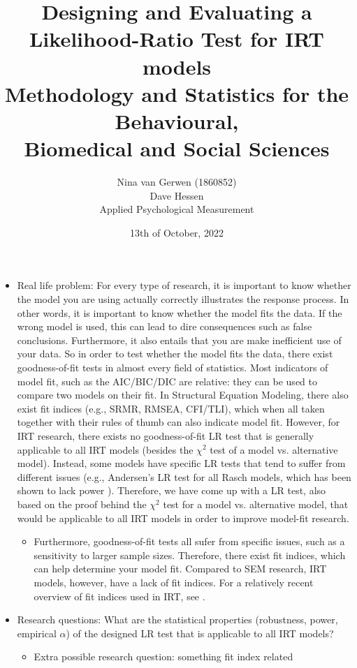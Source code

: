 \documentclass{article}
\title{%
	Designing and Evaluating a Likelihood-Ratio Test for IRT models \\
	\large Methodology and Statistics for the Behavioural, \\
	Biomedical and Social Sciences}
\author{Nina van Gerwen (1860852) \\
	Dave Hessen \\
	\small Applied Psychological Measurement}
\date{13th of October, 2022}
\begin{document}
\maketitle

\newpage
\begin{itemize}
\item Real life problem: For every type of research, it is important to know whether the model you are using actually correctly illustrates the response process. In other words, it is important to know whether the model fits the data. If the wrong model is used, this can lead to dire consequences such as false conclusions. Furthermore, it also entails that you are make inefficient use of your data. So in order to test whether the model fits the data, there exist goodness-of-fit tests in almost every field of statistics. Most indicators of model fit, such as the AIC/BIC/DIC are relative: they can be used to compare two models on their fit. In Structural Equation Modeling, there also exist fit indices (e.g., SRMR, RMSEA, CFI/TLI), which when all taken together with their rules of thumb can also indicate model fit. However, for IRT research, there exists no goodness-of-fit LR test that is generally applicable to all IRT models (besides the $\chi^2$ test of a model vs. alternative model). Instead, some models have specific LR tests that tend to suffer from different issues (e.g., Andersen's LR test for all Rasch models, which has been shown to lack power \autocite{ref2}). Therefore, we have come up with a LR test, also based on the proof behind the $\chi^2$ test for a model vs. alternative model, that would be applicable to all IRT models in order to improve model-fit research. 
	\begin{itemize}
		\item Furthermore, goodness-of-fit tests all sufer from specific issues, such as a sensitivity to larger sample sizes. Therefore, there exist fit indices, which can help determine your model fit. Compared to SEM research, IRT models, however, have a lack of fit indices. For a relatively recent overview of fit indices used in IRT, see \textcite{ref1}.
	\end{itemize}
\item Research questions: What are the statistical properties (robustness, power, empirical $\alpha$) of the designed LR test that is applicable to all IRT models?
	\begin{itemize} 
		\item Extra possible research question: something fit index related
	\end{itemize}

\end{itemize}
\end{document}
